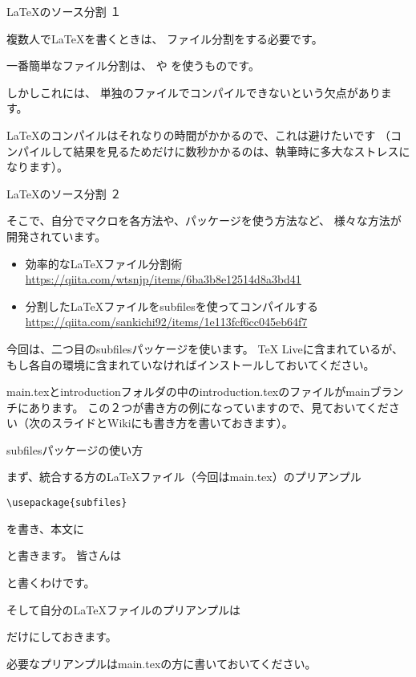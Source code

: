 \documentclass[12pt, unicode]{beamer}
\begin{document}
\begin{frame}[fragile]{\LaTeX のソース分割 １}

複数人でLaTeXを書くときは、
ファイル分割をする必要です。

一番簡単なファイル分割は、
\verb||
や
\verb||
を使うものです。

しかしこれには、
単独のファイルでコンパイルできないという欠点があります。

LaTeXのコンパイルはそれなりの時間がかかるので、これは避けたいです
（コンパイルして結果を見るためだけに数秒かかるのは、執筆時に多大なストレスになります）。

\end{frame}
\begin{frame}{\LaTeX のソース分割 ２}

そこで、自分でマクロを各方法や、パッケージを使う方法など、
様々な方法が開発されています。

\begin{itemize}
\item 効率的なLaTeXファイル分割術 \url{https://qiita.com/wtsnjp/items/6ba3b8e12514d8a3bd41}
\item 分割したLaTeXファイルをsubfilesを使ってコンパイルする　\url{https://qiita.com/sankichi92/items/1e113fcf6cc045eb64f7}
\end{itemize}

今回は、二つ目のsubfilesパッケージを使います。
TeX Liveに含まれているが、もし各自の環境に含まれていなければインストールしておいてください。

main.texとintroductionフォルダの中のintroduction.texのファイルがmainブランチにあります。
この２つが書き方の例になっていますので、見ておいてください（次のスライドとWikiにも書き方を書いておきます）。

\end{frame}
\begin{frame}[fragile]{subfilesパッケージの使い方}

まず、統合する方の\LaTeX ファイル（今回はmain.tex）のプリアンプル

\verb|\usepackage{subfiles}|

を書き、本文に

\verb||

と書きます。
皆さんは

\verb||

と書くわけです。

そして自分の\LaTeX ファイルのプリアンプルは

\verb||

だけにしておきます。

必要なプリアンプルはmain.texの方に書いておいてください。

\end{frame}
\end{document}
